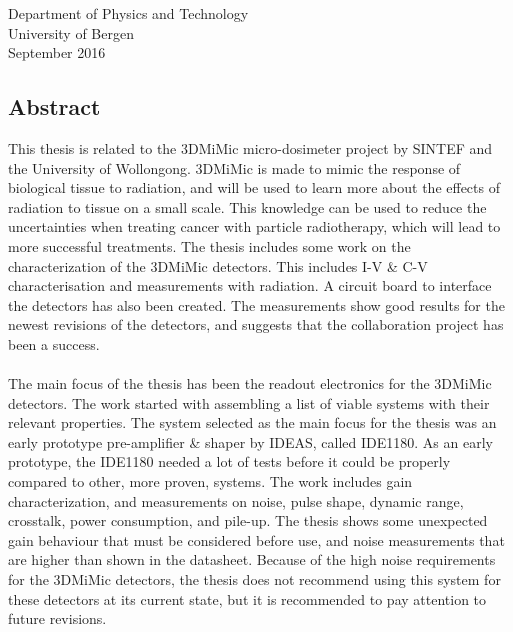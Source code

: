 \documentclass[12pt, a4paper]{report}
\begin{document}
\begin{titlepage}
\begin{center}
{	\large {Department of Physics and Technology}\\
	\large {University of Bergen}\\[1cm]
	September 2016}
\end{center}
\end{titlepage}

\blankpage	%


\clearpage	%
\begin{center}
\begin{minipage}{\textwidth}
\chapter*{Abstract} %
This thesis is related to the 3DMiMic micro-dosimeter project by SINTEF and the University of Wollongong. 3DMiMic is made to mimic the response of biological tissue to radiation, and will be used to learn more about the effects of radiation to tissue on a small scale. This knowledge can be used to reduce the uncertainties when treating cancer with particle radiotherapy, which will lead to more successful treatments. The thesis includes some work on the characterization of the 3DMiMic detectors. This includes I-V \& C-V characterisation and measurements with radiation. A circuit board to interface the detectors has also been created. The measurements show good results for the newest revisions of the detectors, and suggests that the collaboration project has been a success.
\\ \\
The main focus of the thesis has been the readout electronics for the 3DMiMic detectors. The work started with assembling a list of viable systems with their relevant properties. The system selected as the main focus for the thesis was an early prototype pre-amplifier \& shaper by IDEAS, called IDE1180. As an early prototype, the IDE1180 needed a lot of tests before it could be properly compared to other, more proven, systems. The work includes gain characterization, and measurements on noise, pulse shape, dynamic range, crosstalk, power consumption, and pile-up. The thesis shows some unexpected gain behaviour that must be considered before use, and noise measurements that are higher than shown in the datasheet. Because of the high noise requirements for the 3DMiMic detectors, the thesis does not recommend using this system for these detectors at its current state, but it is recommended to pay attention to future revisions. 


\end{minipage}
\end{center}
\clearpage
\end{document}
